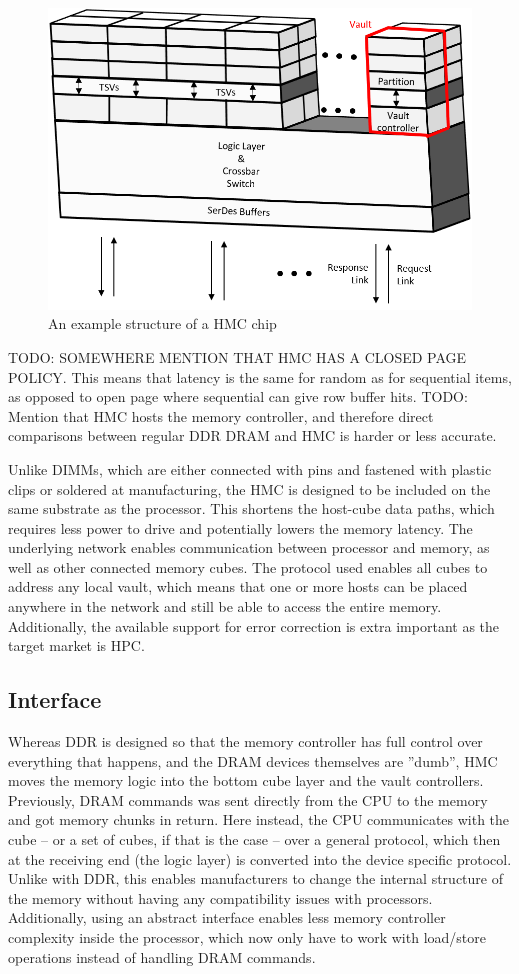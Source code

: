 \begin{figure}[h!]
\centering
\includegraphics[width=0.75\linewidth]{figure/HMC_structures.png}
\caption{An example structure of a HMC chip }
\label{HMC-structure}
\end{figure}

TODO: SOMEWHERE MENTION THAT HMC HAS A CLOSED PAGE POLICY. This means that latency is the same for random as for sequential items, as opposed to open page where sequential can give row buffer hits.
TODO: Mention that HMC hosts the memory controller, and therefore direct comparisons between regular DDR DRAM and HMC is harder or less accurate. 

Unlike DIMMs, which are either connected with pins and fastened with plastic clips or soldered at manufacturing, the HMC is designed to be included on the same substrate as the processor. This shortens the host-cube data paths, which requires less power to drive and potentially lowers the memory latency. The underlying network enables communication between processor and memory, as well as other connected memory cubes. The protocol used enables all cubes to address any local vault, which means that one or more hosts can be placed anywhere in the network and still be able to access the entire memory. Additionally, the available support for error correction is extra important as the target market is HPC. 

\subsection{Interface}
Whereas DDR is designed so that the memory controller has full control over everything that happens, and the DRAM devices themselves are ''dumb'', HMC moves the memory logic into the bottom cube layer and the vault controllers. Previously, DRAM commands was sent directly from the CPU to the memory and got memory chunks in return. Here instead, the CPU communicates with the cube -- or a set of cubes, if that is the case -- over a general protocol, which then at the receiving end (the logic layer) is converted into the device specific protocol. Unlike with DDR, this enables manufacturers to change the internal structure of the memory without having any compatibility issues with processors. Additionally, using an abstract interface enables less memory controller complexity inside the processor, which now only have to work with load/store operations instead of handling DRAM commands. 
\bigskip

